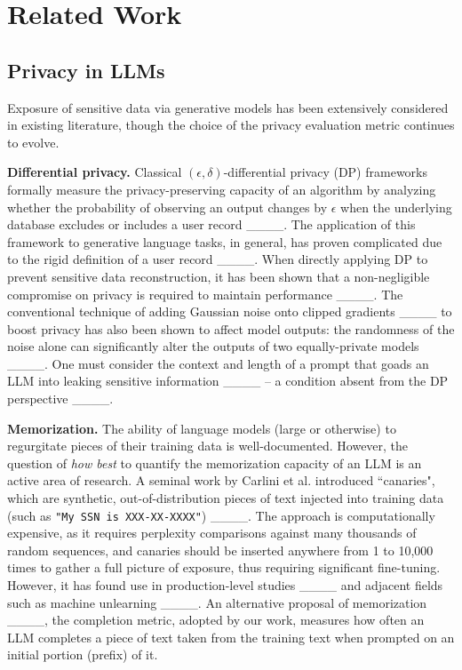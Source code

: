 \section{Related Work}
\label{sec:related_work}
\subsection{Privacy in LLMs}
Exposure of sensitive data via generative models has been extensively considered in existing literature, though the choice of the privacy evaluation metric continues to evolve.

\textbf{Differential privacy.} Classical $(\epsilon, \delta)$-differential privacy (DP) frameworks formally measure the privacy-preserving capacity of an algorithm by analyzing whether the probability of observing an output changes by $\epsilon$ when the underlying database excludes or includes a user record ____.
The application of this framework to generative language tasks, in general, has proven complicated due to the rigid definition of a user record ____. When directly applying DP to prevent sensitive data reconstruction, it has been shown that a non-negligible compromise on privacy is required to maintain performance ____. The conventional technique of adding Gaussian noise onto clipped gradients ____ to boost privacy has also been shown to affect model outputs: the randomness of the noise alone can significantly alter the outputs of two equally-private models ____. One must consider the context and length of a prompt that goads an LLM into leaking sensitive information ____ -- a condition absent from the DP perspective ____. 

\textbf{Memorization.} The ability of language models (large or otherwise) to regurgitate pieces of their training data is well-documented. However, the question of \textit{how best} to quantify the memorization capacity of an LLM is an active area of research. A seminal work by Carlini et al. introduced ``canaries", which are synthetic, out-of-distribution pieces of text injected into training data (such as \texttt{"My SSN is XXX-XX-XXXX"}) ____. The approach is computationally expensive, as it requires perplexity comparisons against many thousands of random sequences, and canaries should be inserted anywhere from 1 to 10,000 times to gather a full picture of exposure, thus requiring significant fine-tuning. However, it has found use in production-level studies ____ and adjacent fields such as machine unlearning ____. An alternative proposal of memorization ____, the completion metric, adopted by our work, measures how often an LLM completes a piece of text taken from the training text when prompted on an initial portion (prefix) of it.

